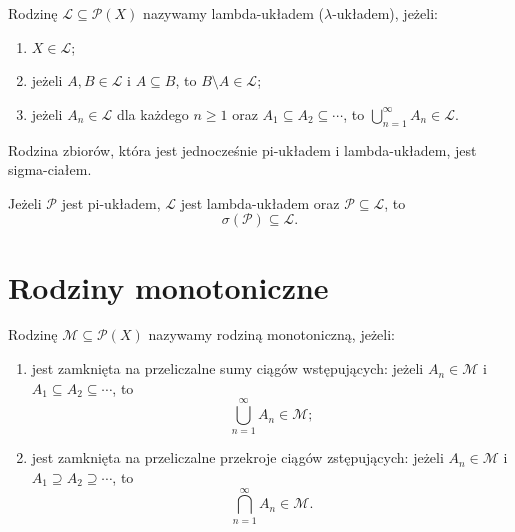 \begin{definicja}
\label{def:lambda-uklad}
Rodzinę $\mathcal{L}\subseteq\mathcal{P}(X)$ nazywamy lambda-układem
($\lambda$-układem), jeżeli:
\begin{enumerate}
  \item $X\in\mathcal{L}$;
  \item jeżeli $A,B\in\mathcal{L}$ i $A\subseteq B$,
  to $B\setminus A\in\mathcal{L}$;
  \item jeżeli $A_n\in\mathcal{L}$ dla każdego $n\geq1$ oraz
  $A_1\subseteq A_2\subseteq\cdots$, to
  $\bigcup_{n=1}^{\infty}A_n\in\mathcal{L}$.
\end{enumerate}
\end{definicja}

\begin{twierdzenie}
\label{tw:pi-lambda-sigma}
Rodzina zbiorów, która jest jednocześnie pi-układem i lambda-układem,
jest sigma-ciałem.
\end{twierdzenie}

\begin{twierdzenie}
\label{tw:pi-lambda}
Jeżeli $\mathcal{P}$ jest pi-układem, $\mathcal{L}$ jest lambda-układem
oraz $\mathcal{P}\subseteq\mathcal{L}$, to
\begin{equation}
  \sigma(\mathcal{P})\subseteq\mathcal{L}.
  \label{eq:pi-lambda}
\end{equation}
\end{twierdzenie}

\section{Rodziny monotoniczne}
\label{sec:rodziny-monotoniczne}

\begin{definicja}
\label{def:rodzina-monotoniczna}
Rodzinę $\mathcal{M}\subseteq\mathcal{P}(X)$ nazywamy rodziną
monotoniczną, jeżeli:
\begin{enumerate}
  \item jest zamknięta na przeliczalne sumy ciągów wstępujących:
  jeżeli $A_n\in\mathcal{M}$ i $A_1\subseteq A_2\subseteq\cdots$, to
  \[
    \bigcup_{n=1}^{\infty}A_n\in\mathcal{M};
  \]
  \item jest zamknięta na przeliczalne przekroje ciągów zstępujących:
  jeżeli $A_n\in\mathcal{M}$ i $A_1\supseteq A_2\supseteq\cdots$, to
  \[
    \bigcap_{n=1}^{\infty}A_n\in\mathcal{M}.
  \]
\end{enumerate}
\end{definicja}

